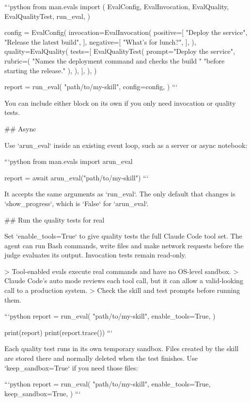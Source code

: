 ```python
from man.evals import (
    EvalConfig,
    EvalInvocation,
    EvalQuality,
    EvalQualityTest,
    run_eval,
)

config = EvalConfig(
    invocation=EvalInvocation(
        positive=[
            "Deploy the service",
            "Release the latest build",
        ],
        negative=[
            "What's for lunch?",
        ],
    ),
    quality=EvalQuality(
        tests=[
            EvalQualityTest(
                prompt="Deploy the service",
                rubric=(
                    "Names the deployment command and checks the build "
                    "before starting the release."
                ),
            ),
        ],
    ),
)

report = run_eval(
    "path/to/my-skill",
    config=config,
)
```

You can include either block on its own if you only need invocation or quality tests.

## Async

Use `arun_eval` inside an existing event loop, such as a server or async notebook:

```python
from man.evals import arun_eval

report = await arun_eval("path/to/my-skill")
```

It accepts the same arguments as `run_eval`.
The only default that changes is `show_progress`, which is `False` for `arun_eval`.

## Run the quality tests for real

Set `enable_tools=True` to give quality tests the full Claude Code tool set.
The agent can run Bash commands, write files and make network requests before the judge evaluates its output.
Invocation tests remain read-only.

> Tool-enabled evals execute real commands and have no OS-level sandbox.
> Claude Code's auto mode reviews each tool call, but it can allow a valid-looking call to a production system.
> Check the skill and test prompts before running them.

```python
report = run_eval(
    "path/to/my-skill",
    enable_tools=True,
)

print(report)
print(report.trace())
```

Each quality test runs in its own temporary sandbox.
Files created by the skill are stored there and normally deleted when the test finishes.
Use `keep_sandbox=True` if you need those files:

```python
report = run_eval(
    "path/to/my-skill",
    enable_tools=True,
    keep_sandbox=True,
)
```

